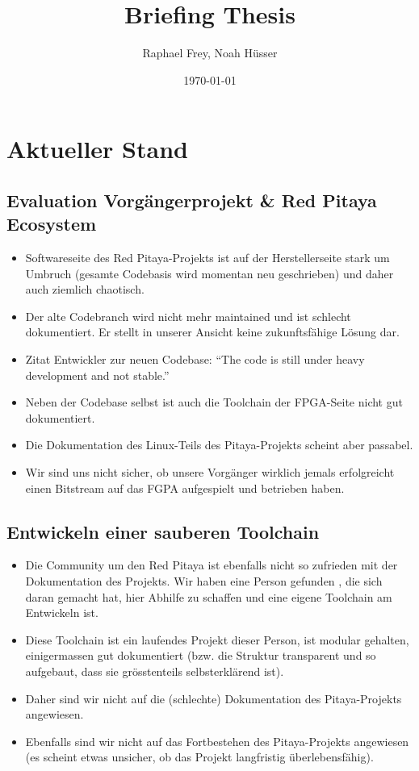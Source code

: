 \documentclass[11pt]{article}
\author{Raphael Frey, Noah H\"usser}
\title{Briefing Thesis}
\date{\today}
\begin{document}
\maketitle
\section{Aktueller Stand}
\subsection{Evaluation Vorg\"angerprojekt \& Red Pitaya Ecosystem}
\begin{itemize}
    \item Softwareseite  des Red  Pitaya-Projekts ist auf  der Herstellerseite
    stark um  Umbruch (gesamte  Codebasis wird  momentan neu  geschrieben) und
    daher auch ziemlich chaotisch.
    \item  Der alte  Codebranch wird  nicht mehr  maintained und  ist schlecht
    dokumentiert. Er stellt in unserer Ansicht keine zukunftsf\"ahige L\"osung
    dar.
    \item Zitat Entwickler zur neuen Codebase: ``The code is still under heavy
    development and not stable.'' \cite{codebranches}
    \item  Neben der  Codebase selbst  ist auch  die Toolchain  der FPGA-Seite
    nicht gut dokumentiert.
    \item Die  Dokumentation des Linux-Teils des  Pitaya-Projekts scheint aber
    passabel.
    \item Wir  sind uns  nicht sicher, ob  unsere Vorg\"anger  wirklich jemals
    erfolgreicht einen Bitstream auf das FGPA aufgespielt und betrieben haben.
\end{itemize}
\subsection{Entwickeln einer sauberen Toolchain}
\begin{itemize}
    \item Die  Community um den  Red Pitaya  ist ebenfalls nicht  so zufrieden
    mit  der  Dokumentation  des  Projekts. Wir  haben  eine  Person  gefunden
    \cite{pavel}, die  sich daran  gemacht hat, hier  Abhilfe zu  schaffen und
    eine eigene Toolchain am Entwickeln ist.
    \item Diese Toolchain ist ein laufendes Projekt dieser Person, ist modular
    gehalten, einigermassen  gut dokumentiert  (bzw. die  Struktur transparent
    und so aufgebaut, dass sie gr\"osstenteils selbsterkl\"arend ist).
    \item  Daher  sind  wir  nicht   auf  die  (schlechte)  Dokumentation  des
    Pitaya-Projekts angewiesen.
    \item Ebenfalls  sind wir nicht  auf das Fortbestehen  des Pitaya-Projekts
    angewiesen  (es  scheint  etwas   unsicher,  ob  das  Projekt  langfristig
    \"uberlebensf\"ahig).
\end{itemize}
\end{document}

